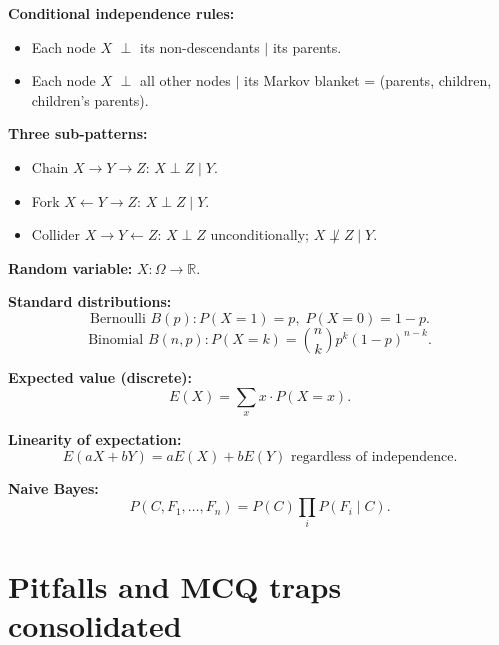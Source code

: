 \documentclass[11pt, a4paper]{article}
\begin{document}
\textbf{Conditional independence rules:}
\begin{itemize}[itemsep=0pt, topsep=0pt]
  \item Each node $X$ $\perp$ its non-descendants $\mid$ its parents.
  \item Each node $X$ $\perp$ all other nodes $\mid$ its Markov blanket = (parents, children, children's parents).
\end{itemize}

\textbf{Three sub-patterns:}
\begin{itemize}[itemsep=0pt, topsep=0pt]
  \item Chain $X \to Y \to Z$: $X \perp Z \mid Y$.
  \item Fork $X \leftarrow Y \to Z$: $X \perp Z \mid Y$.
  \item Collider $X \to Y \leftarrow Z$: $X \perp Z$ unconditionally; $X \not\perp Z \mid Y$.
\end{itemize}

\textbf{Random variable:} $X : \Omega \to \mathbb{R}$.

\textbf{Standard distributions:}
\[
\text{Bernoulli } B(p): P(X = 1) = p, \; P(X = 0) = 1 - p.
\]
\[
\text{Binomial } B(n, p): P(X = k) = \binom{n}{k} p^k (1 - p)^{n - k}.
\]

\textbf{Expected value (discrete):}
\[
E(X) = \sum_x x \cdot P(X = x).
\]

\textbf{Linearity of expectation:}
\[
E(aX + bY) = a E(X) + b E(Y) \text{ regardless of independence}.
\]

\textbf{Naive Bayes:}
\[
P(C, F_1, \dots, F_n) = P(C) \prod_i P(F_i \mid C).
\]

\section*{Pitfalls and MCQ traps consolidated}
\end{document}
